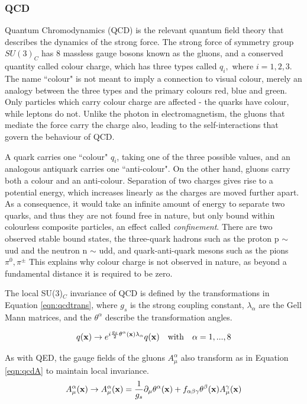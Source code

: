 \subsubsection{QCD}

Quantum Chromodynamics (QCD) is the relevant quantum field theory that describes the dynamics of the strong force. The strong force of symmetry group $SU(3)_{C}$ has 8 massless gauge bosons known as the gluons, and a conserved quantity called colour charge, which has three types called $q_{i},$ where $i=1, 2, 3$. The name ``colour" is not meant to imply a connection to visual colour, merely an analogy between the three types and the primary colours red, blue and green. Only particles which carry colour charge are affected - the quarks have colour, while leptons do not. Unlike the photon in electromagnetism, the gluons that mediate the force carry the charge also, leading to the self-interactions that govern the behaviour of QCD. 

A quark carries one ``colour" $q_{i}$, taking one of the three possible values, and an analogous antiquark carries one ``anti-colour". On the other hand, gluons carry both a colour and an anti-colour.  Separation of two charges gives rise to a potential energy, which increases linearly as the charges are moved further apart. As a consequence, it would take an infinite amount of energy to separate two quarks, and thus they are not found free in nature, but only bound within colourless composite particles, an effect called \textit{confinement}. There are two observed stable bound states, the three-quark hadrons such as the proton p $\sim$ uud and the neutron n $\sim$ udd, and quark-anti-quark mesons such as the pions $\pi^{0}, \pi^{\pm}$ This explains why colour charge is not observed in nature, as beyond a fundamental distance it is required to be zero.

The local SU(3)$_{C}$ invariance of QCD is defined by the transformations in Equation \ref{eqn:qcdtrans}, where $g_{s}$ is the strong coupling constant, $\lambda_{\alpha}$ are the Gell Mann matrices, and the $\theta^{\alpha}$ describe the transformation angles. 

\begin{equation}
q(\mathbf{x}) \rightarrow e^{i\frac{g_{s}}{2}\theta^{\alpha}(\mathbf{x}) \lambda_{\alpha}} q(\mathbf{x}) \quad \mathrm{with} \quad \alpha = 1, ... , 8
\label{eqn:qcdtrans}
\end{equation}


As with QED, the gauge fields of the gluons $A^{\alpha}_{\mu} $ also transform as in Equation \ref{eqn:qcdA} to maintain local invariance. 
\begin{equation}
A^{\alpha}_{\mu}(\mathbf{x}) \rightarrow A^{\alpha}_{\mu}(\mathbf{x}) = \frac{1}{g_{s}} \partial_{\mu}\theta^{\alpha}(\mathbf{x}) + f_{\alpha \beta \gamma}\theta^{\beta}(\mathbf{x})A^{\gamma}_{\mu}(\mathbf{x})
\label{eqn:qcdA}
\end{equation}


